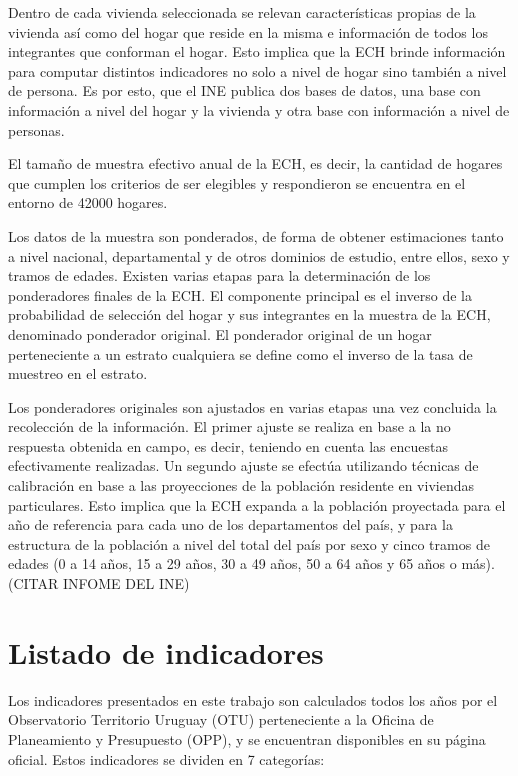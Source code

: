 \documentclass[12pt,twoside,spanish,a4paper]{book}\usepackage[]{graphicx}\usepackage[]{color}
\begin{document}
Dentro de cada vivienda seleccionada se relevan características propias de la vivienda así como del hogar que reside en la misma e información de todos los integrantes que conforman el hogar. Esto implica que la ECH brinde información para computar distintos indicadores no solo a nivel de hogar sino también a nivel de persona. Es por esto, que el INE publica dos bases de datos, una base con información a nivel del hogar y la vivienda y otra base con información a nivel de personas.

El tamaño de muestra efectivo anual de la ECH, es decir, la cantidad de hogares que cumplen los criterios de ser elegibles y respondieron se encuentra en el entorno de 42000 hogares.

Los datos de la muestra son ponderados, de forma de obtener estimaciones tanto a nivel nacional, departamental y de otros dominios de estudio, entre ellos, sexo y tramos de edades. Existen varias etapas para la determinación de los ponderadores finales de la ECH. El componente principal es el inverso de la probabilidad de selección del hogar y sus integrantes en la muestra de la ECH, denominado ponderador original. El ponderador original de un hogar perteneciente a un estrato cualquiera se define como el inverso de la tasa de muestreo en el estrato.

Los ponderadores originales son ajustados en varias etapas una vez concluida la recolección de la información. El primer ajuste se realiza en base a la no respuesta obtenida en campo, es decir, teniendo en cuenta las encuestas efectivamente realizadas. Un segundo ajuste se efectúa utilizando técnicas de calibración en base a las proyecciones de la población residente en viviendas particulares. Esto implica que la ECH expanda a la población proyectada para el año de referencia para cada uno de los departamentos del país, y para la estructura de la población a nivel del total del país por sexo y cinco tramos de edades (0 a 14 años, 15 a 29 años, 30 a 49 años, 50 a 64 años y 65 años o más). \citep{ine} (CITAR INFOME DEL INE)


\section{Listado de indicadores \label{sec:lista}}

Los indicadores presentados en este trabajo son calculados todos los años por el Observatorio Territorio Uruguay (OTU) perteneciente a la Oficina de Planeamiento y Presupuesto (OPP), y se encuentran disponibles en su página oficial. Estos indicadores se dividen en 7 categorías:
\end{document}
